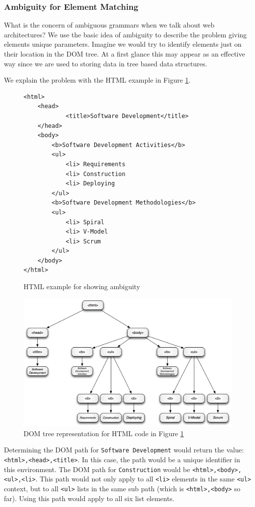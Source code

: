\subsubsection{Ambiguity for Element Matching}

What is the concern of ambiguous grammars when we talk about web architectures? We use the basic idea of ambiguity to describe the problem giving elements unique parameters. Imagine we would try to identify elements just on their location in the DOM tree. At a first glance this may appear as an effective way since we are used to storing data in tree based data structures. 

We explain the problem with the HTML example in Figure \ref{dom-html-example}.

\begin{figure}
\begin{lstlisting}
<html>
	<head>
			<title>Software Development</title>
	</head>
	<body>
		<b>Software Development Activities</b>
		<ul>		
			<li> Requirements 
			<li> Construction 
			<li> Deploying		
		</ul>
		<b>Software Development Methodologies</b>
		<ul>		
			<li> Spiral
			<li> V-Model 
			<li> Scrum		
		</ul>
	</body>
</html>
\end{lstlisting}
\label{dom-html-example}
\caption{HTML example for showing ambiguity}
\end{figure}


\begin{figure}\centering
		\includegraphics[width=13cm]{images/dom-tree-example.png}
		\caption{DOM tree representation for HTML code in Figure \ref{dom-html-example}}
		\label{dom-tree-example}
\end{figure} 

Determining the DOM path for \verb^Software Development^ would return the value: \verb^<html>,<head>,<title>^. In this case, the path would be a unique identifier in this environment. 
The DOM path for \verb^Construction^ would be \verb^<html>,<body>,<ul>,<li>^. This path would not only apply to all \verb^<li>^ elements in the same \verb^<ul>^ context, but to all \verb^<ul>^ lists in the same sub path (which is \verb^<html>,<body>^ so far). Using this path would apply to all six list elements. 


